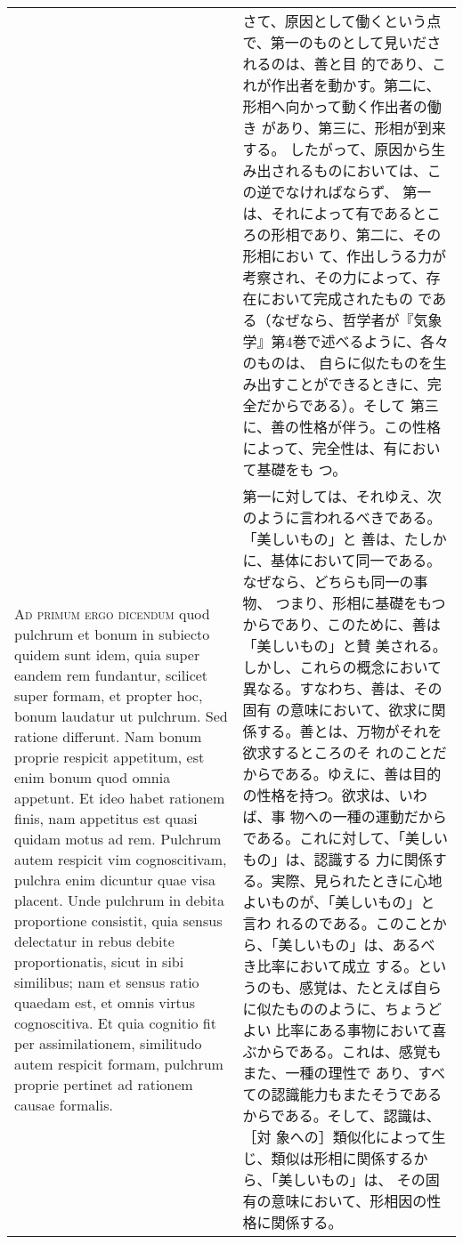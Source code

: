 \documentclass[10pt]{jsarticle} %
\begin{document}
\begin{longtable}{p{21em}p{21em}}
&


さて、原因として働くという点で、第一のものとして見いだされるのは、善と目
 的であり、これが作出者を動かす。第二に、形相へ向かって動く作出者の働き
 があり、第三に、形相が到来する。
したがって、原因から生み出されるものにおいては、この逆でなければならず、
 第一は、それによって有であるところの形相であり、第二に、その形相におい
 て、作出しうる力が考察され、その力によって、存在において完成されたもの
 である（なぜなら、哲学者が『気象学』第4巻で述べるように、各々のものは、
 自らに似たものを生み出すことができるときに、完全だからである）。そして
 第三に、善の性格が伴う。この性格によって、完全性は、有において基礎をも
 つ。

\\



{\scshape Ad primum ergo dicendum} quod pulchrum et bonum in subiecto quidem
 sunt idem, quia super eandem rem fundantur, scilicet super formam, et
 propter hoc, bonum laudatur ut pulchrum. Sed ratione differunt. Nam
 bonum proprie respicit appetitum, est enim bonum quod omnia
 appetunt. Et ideo habet rationem finis, nam appetitus est quasi quidam
 motus ad rem. Pulchrum autem respicit vim cognoscitivam, pulchra enim
 dicuntur quae visa placent. Unde pulchrum in debita proportione
 consistit, quia sensus delectatur in rebus debite proportionatis, sicut
 in sibi similibus; nam et sensus ratio quaedam est, et omnis virtus
 cognoscitiva. Et quia cognitio fit per assimilationem, similitudo autem
 respicit formam, pulchrum proprie pertinet ad rationem causae formalis.

&


第一に対しては、それゆえ、次のように言われるべきである。「美しいもの」と
 善は、たしかに、基体において同一である。なぜなら、どちらも同一の事物、
 つまり、形相に基礎をもつからであり、このために、善は「美しいもの」と賛
 美される。しかし、これらの概念において異なる。すなわち、善は、その固有
 の意味において、欲求に関係する。善とは、万物がそれを欲求するところのそ
 れのことだからである。ゆえに、善は目的の性格を持つ。欲求は、いわば、事
 物への一種の運動だからである。これに対して、「美しいもの」は、認識する
 力に関係する。実際、見られたときに心地よいものが、「美しいもの」と言わ
 れるのである。このことから、「美しいもの」は、あるべき比率において成立
 する。というのも、感覚は、たとえば自らに似たもののように、ちょうどよい
 比率にある事物において喜ぶからである。これは、感覚もまた、一種の理性で
 あり、すべての認識能力もまたそうであるからである。そして、認識は、［対
 象への］類似化によって生じ、類似は形相に関係するから、「美しいもの」は、
 その固有の意味において、形相因の性格に関係する。


\end{longtable}
\end{document}

